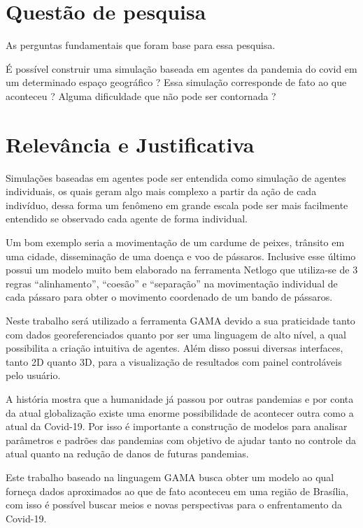 \section{Questão de pesquisa}%
As perguntas fundamentais que foram base para essa pesquisa.

É possível construir uma simulação baseada em agentes da pandemia do covid em um determinado espaço geográfico ?  Essa simulação corresponde de fato ao que aconteceu ? Alguma dificuldade que não pode ser contornada ?


\section{Relevância e Justificativa}%

Simulações baseadas em agentes pode ser entendida como simulação de agentes individuais, os quais geram algo mais complexo a partir da ação de cada indivíduo, dessa forma um fenômeno em grande escala pode ser mais facilmente entendido se observado cada agente de forma individual.

Um bom exemplo seria a movimentação de um cardume de peixes, trânsito em uma cidade, disseminação de uma doença e voo de pássaros. Inclusive esse último possui um modelo muito bem elaborado na ferramenta Netlogo que utiliza-se de 3 regras “alinhamento”, “coesão” e “separação” na movimentação individual de cada pássaro para obter o movimento coordenado de um bando de pássaros.

Neste trabalho será utilizado a ferramenta GAMA devido a sua praticidade tanto com dados georeferenciados quanto por ser uma linguagem de alto nível, a qual possibilita a criação intuitiva de agentes. Além disso possui diversas interfaces, tanto 2D quanto 3D, para a visualização de resultados com painel controláveis pelo usuário.

A história mostra que a humanidade já passou por outras pandemias e por conta da atual globalização existe uma enorme possibilidade de acontecer outra como a atual da Covid-19. Por isso é importante a construção de modelos para analisar parâmetros e padrões das pandemias com objetivo de ajudar tanto no controle da atual quanto na redução de danos de futuras pandemias. 

Este trabalho baseado na linguagem GAMA busca obter um modelo ao qual forneça dados aproximados ao que de fato aconteceu em uma região de Brasília, com isso é possível buscar meios e novas perspectivas para o enfrentamento da Covid-19.

